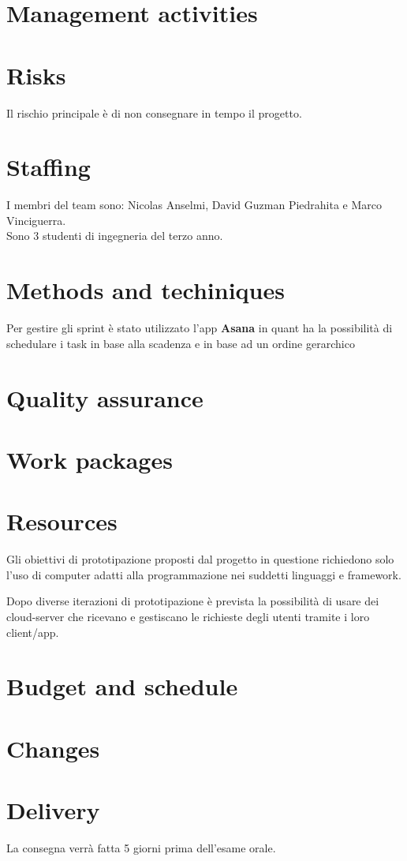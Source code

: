 \documentclass{article}
\begin{document}
\section{Management activities}

\section{Risks}
Il rischio principale è di non consegnare in tempo il progetto.
\section{Staffing}
I membri del team sono: Nicolas Anselmi, David Guzman Piedrahita e Marco Vinciguerra.
\\Sono 3 studenti di ingegneria del terzo anno.

\section{Methods and techiniques}
Per gestire gli sprint è stato utilizzato l'app \textbf{Asana} in quant ha la possibilità di schedulare i task in base alla scadenza e in base ad un ordine gerarchico
\section{Quality assurance}

\section{Work packages}


\section{Resources}
Gli obiettivi di prototipazione proposti dal progetto in questione richiedono solo l'uso di computer adatti alla programmazione nei suddetti linguaggi e framework.

Dopo diverse iterazioni di prototipazione è prevista la possibilità di usare dei cloud-server che ricevano e gestiscano le richieste degli utenti tramite i loro client/app. 

\section{Budget and schedule}

\section{Changes}

\section{Delivery}
La consegna verrà fatta 5 giorni prima dell'esame orale.
\end{document}
